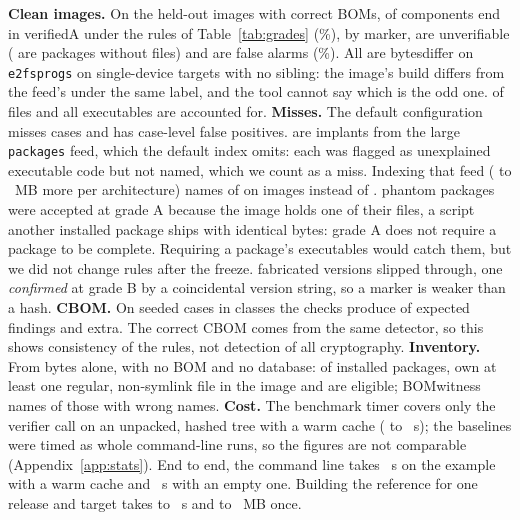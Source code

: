 \documentclass[sigconf,nonacm]{acmart}
\newcommand{\tool}{BOMwitness}
\newcommand{\ubreak}{\textunderscore\allowbreak}
\newcommand{\vd}[1]{{\ttfamily\let\_\ubreak #1}}
\begin{document}
\textbf{Clean images.} On the held-out images with correct BOMs, \cleanVerA{} of \cleanDeclared{} components end in \vd{verified\_A} under the rules of Table~\ref{tab:grades} (\cleanVerAPct\%), \cleanVerB{} by marker, \cleanUnver{} are unverifiable (\cleanUnverMeta{} are packages without files) and \cleanAlarms{} are false alarms (\cleanAlarmPct\%). All \cleanAlarms{} are \vd{bytes\_differ} on \texttt{e2fsprogs} on single-device targets with no sibling: the image's build differs from the feed's under the same label, and the tool cannot say which is the odd one. \cleanAccounted{} of \cleanFiles{} files and all \cleanCode{} executables are accounted for.
\textbf{Misses.} The default configuration misses \nMisses{} cases and has \caseFp{} case-level false positives. \missImplant{} are implants from the large \texttt{packages} feed, which the default index omits: each was flagged as unexplained executable code but not named, which we count as a miss. Indexing that feed (\wideMbMin{} to \wideMbMax{}~MB more per architecture) names \wideAfter{} of \wideCases{} on \wideImages{} images instead of \wideBefore. \missPhantom{} phantom packages were accepted at grade A because the image holds one of their files, a script another installed package ships with identical bytes: grade A does not require a package to be complete. Requiring a package's executables would catch them, but we did not change rules after the freeze. \missFabricated{} fabricated versions slipped through, one \emph{confirmed} at grade B by a coincidental version string, so a marker is weaker than a hash.
\textbf{CBOM.} On \cbomCases{} seeded cases in \cbomClasses{} classes the checks produce \cbomTp{} of \cbomExpected{} expected findings and \cbomExtra{} extra. The correct CBOM comes from the same detector, so this shows consistency of the rules, not detection of all cryptography.
\textbf{Inventory.} From bytes alone, with no BOM and no database: of \invInstalledAll{} installed packages, \invInstalled{} own at least one regular, non-symlink file in the image and are eligible; \tool{} names \invNamed{} of those with \invWrong{} wrong names.
\textbf{Cost.} The benchmark timer covers only the verifier call on an unpacked, hashed tree with a warm cache (\secMin{} to \secMax{}~s); the baselines were timed as whole command-line runs, so the figures are not comparable (Appendix~\ref{app:stats}). End to end, the command line takes \eTwoEWarm~s on the example with a warm cache and \eTwoECold~s with an empty one. Building the reference for one release and target takes \indexSecMin{} to \indexSecMax{}~s and \indexMbMin{} to \indexMbMax{}~MB once.
\end{document}
